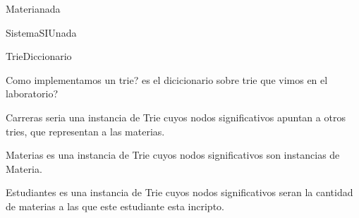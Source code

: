 \documentclass[a4paper,10pt]{article}
\begin{document}
\salto{\baselineskip}

\begin{design}{Materia}{nada}
\end{design}

\begin{design}{SistemaSIU}{nada}

\end{design}
\begin{design}{Trie}{Diccionario}
    
    {\color{ForestGreen} Como implementamos un trie? es el dicicionario sobre trie que vimos en el laboratorio?}
\end{design}

Carreras seria una instancia de Trie cuyos nodos significativos apuntan a otros tries, que representan a las materias.

Materias es una instancia de Trie cuyos nodos significativos son instancias de Materia.

Estudiantes es una instancia de Trie cuyos nodos significativos seran la cantidad de materias a las que este estudiante esta incripto.
\end{document}
